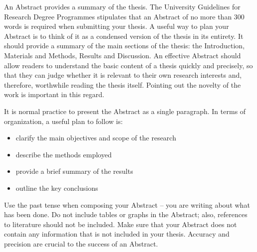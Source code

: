 


\begin{abstracts}        %

An Abstract provides a summary of the thesis. The University Guidelines for Research Degree Programmes stipulates that an Abstract of no more than 300 words is required when submitting your thesis. A useful way to plan your Abstract is to think of it as a condensed version of the thesis in its entirety. It should provide a summary of the main sections of the thesis: the Introduction, Materials and Methods, Results and Discussion. An effective Abstract should allow readers to understand the basic content of a thesis quickly and precisely, so that they can judge whether it is relevant to their own research interests and, therefore, worthwhile reading the thesis itself. Pointing out the novelty of the work is important in this regard.

It is normal practice to present the Abstract as a single paragraph. In terms of organization, a
useful plan to follow is:

\begin{itemize}
	\item clarify the main objectives and scope of the research
	\item describe the methods employed
	\item  provide a brief summary of the results
	\item outline the key conclusions
\end{itemize}

Use the past tense when composing your Abstract – you are writing about what has been done. Do not include tables or graphs in the Abstract; also, references to literature should not be included. Make sure that your Abstract does not contain any information that is not included in your thesis. Accuracy and precision are crucial to the success of an Abstract.
 
\end{abstracts}
